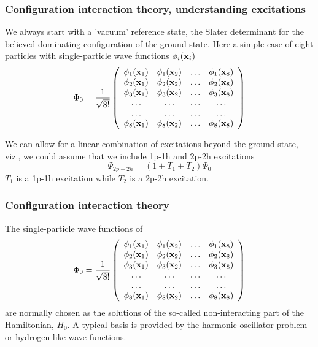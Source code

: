\documentclass[compress]{beamer}
\begin{document}
 \frame
 {
   \frametitle{Configuration interaction theory, understanding excitations}
 \begin{small}
 {\scriptsize
 We always start with a 'vacuum' reference state, the Slater determinant for the believed
 dominating configuration of the ground state. Here a simple case of
 eight particles with single-particle wave functions $\phi_i({\bf x}_i)$
 \[
 \Phi_0 =
       \frac{1}{\sqrt{8!}}\left( \begin{array}{cccc} 
 \phi_1({\bf x}_1) & \phi_1({\bf x}_2) & \dots & \phi_1({\bf x}_8) \\
 \phi_2({\bf x}_1) & \phi_2({\bf x}_2) & \dots & \phi_2({\bf x}_8) \\
 \phi_3({\bf x}_1) & \phi_3({\bf x}_2) & \dots & \phi_3({\bf x}_8) \\
 \dots & \dots & \dots & \dots \\ \dots & \dots & \dots & \dots \\
 \phi_8({\bf x}_1) & \phi_8({\bf x}_2) & \dots & \phi_8({\bf x}_8) 
	      \end{array} \right)
 \]

 We can allow for a linear combination of excitations beyond the ground state, viz., we could assume that we include 1p-1h and 2p-2h excitations
 \[
 \Psi_{2p-2h}=(1+T_1+T_2)\Phi_0
 \]
 $T_1$ is a 1p-1h excitation while $T_2$ is a 2p-2h excitation.
 }
 \end{small}

 }



 \frame
 {
   \frametitle{Configuration interaction theory}
 \begin{small}
 {\scriptsize
The single-particle wave functions of 
 \[
 \Phi_0 =
       \frac{1}{\sqrt{8!}}\left( \begin{array}{cccc} 
 \phi_1({\bf x}_1) & \phi_1({\bf x}_2) & \dots & \phi_1({\bf x}_8) \\
 \phi_2({\bf x}_1) & \phi_2({\bf x}_2) & \dots & \phi_2({\bf x}_8) \\
 \phi_3({\bf x}_1) & \phi_3({\bf x}_2) & \dots & \phi_3({\bf x}_8) \\
 \dots & \dots & \dots & \dots \\ \dots & \dots & \dots & \dots \\
 \phi_8({\bf x}_1) & \phi_8({\bf x}_2) & \dots & \phi_8({\bf x}_8) 
	      \end{array} \right)
 \]
are normally chosen as the solutions of the so-called non-interacting part of the
Hamiltonian, $H_0$.  A typical basis is provided by the harmonic oscillator problem or hydrogen-like wave functions.
 }
 \end{small}

 }
\end{document}
